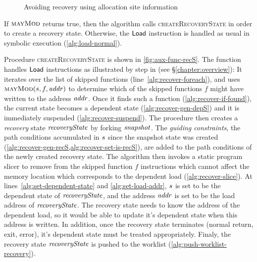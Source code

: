 \begin{figure}
  \centering
    
    \label{fig:dependent-load}
  \caption{Avoiding recovery using allocation site information}
  \label{fig:simpe-dependent-load}
\end{figure}

If $\textsc{mayMod}$ returns true,
then the algorithm calls \textsc{createRecoveryState} in order to create a recovery state.
Otherwise, the $\mathsf{Load}$ instruction is handled as usual in symbolic execution (\cref{alg:load-normal}).

Procedure \textsc{createRecoveryState} is shown in
\ref{fig:aux-func-recS}. The function handles $\mathsf{Load}$
instructions as illustrated by step  in 
(see \S\ref{chapter:overview}):
It iterates over the list of skipped
functions (line~\ref{alg:recover-foreach}), and uses
$\Call{mayMod}{\workstate, f, \addr}$ to determine which of the skipped
functions $f$ might have written to the address $\mathit{addr}$. Once it finds
such a function (\cref{alg:recover-if-found}), the current state
becomes a dependent state (\cref{alg:recover-gen-depS}) and it is
immediately suspended (\cref{alg:recover-suspend}). 
The procedure then creates a \emph{recovery} state $\mathit{recoveryState}$ by
forking $\mathit{snapshot}$.
The \textit{guiding constraints}, \ie  the path conditions accumulated in $s$
since the snapshot state was created (\cref{alg:recover-gen-recS,alg:recover-set-is-recS}),
are added to the path conditions of the newly created recovery state.
The algorithm then invokes a static program slicer to remove from the
skipped function $f$ instructions which cannot affect the memory location which corresponds to
the dependent load (\cref{alg:recover-slice}).
At lines~\ref{alg:set-dependent-state} and \ref{alg:set-load-addr},
$s$ is set to be the dependent state of $\mathit{recoveryState}$,
and the address $\mathit{addr}$ is set to be the load address of $\mathit{recoveryState}$.
The recovery state needs to know the address of the dependent load,
so it would be able to update it's dependent state when this address is written.
In addition, once the recovery state terminates (normal return, exit, error),
it's dependent state must be treated appropriately.
Finaly, the recovery state $\mathit{recoveryState}$ is pushed to the worklist (\cref{alg:push-worklist-recovery}).

